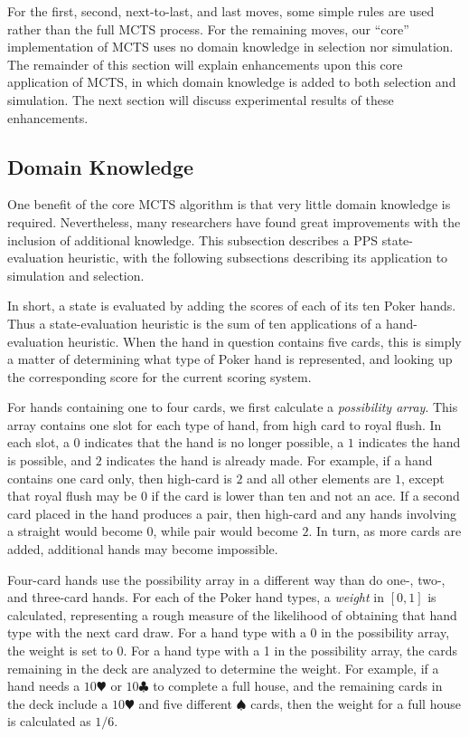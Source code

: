 \documentclass[letterpaper]{article}
\begin{document}
For the first, second, next-to-last, and last moves, some simple rules are used rather than the full MCTS process. For the remaining moves, our ``core'' implementation of MCTS uses no domain knowledge in selection nor simulation. The remainder of this section will explain enhancements upon this core application of MCTS, in which domain knowledge is added to both selection and simulation. The next section will discuss experimental results of these enhancements.


\subsection{Domain Knowledge}

One benefit of the core MCTS algorithm is that very little domain knowledge is required. Nevertheless, many researchers have found great improvements with the inclusion of additional knowledge. This subsection describes a PPS state-evaluation heuristic, with the following subsections describing its application to simulation and selection.

In short, a state is evaluated by adding the scores of each of its ten Poker hands. Thus a state-evaluation heuristic is the sum of ten applications of a hand-evaluation heuristic. When the hand in question contains five cards, this is simply a matter of determining what type of Poker hand is represented, and looking up the corresponding score for the current scoring system.

For hands containing one to four cards, we first calculate a {\it possibility array}. This array contains one slot for each type of hand, from high card to royal flush. In each slot, a $0$ indicates that the hand is no longer possible, a $1$ indicates the hand is possible, and $2$ indicates the hand is already made. For example, if a hand contains one card only, then high-card is $2$ and all other elements are $1$, except that royal flush may be $0$ if the card is lower than ten and not an ace. If a second card placed in the hand produces a pair, then high-card and any hands involving a straight would become $0$, while pair would become $2$. In turn, as more cards are added, additional hands may become impossible.

Four-card hands use the possibility array in a different way than do one-, two-, and three-card hands. For each of the Poker hand types, a {\it weight} in $[0,1]$ is calculated, representing a rough measure of the likelihood of obtaining that hand type with the next card draw. For a hand type with a 0 in the possibility array, the weight is set to 0. For a hand type with a 1 in the possibility array, the cards remaining in the deck are analyzed to determine the weight. For example, if a hand needs a $10\varheartsuit$ or $10\clubsuit$ to complete a full house, and the remaining cards in the deck include a $10\varheartsuit$ and five different $\spadesuit$ cards, then the weight for a full house is calculated as $1 / 6$. 
\end{document}
